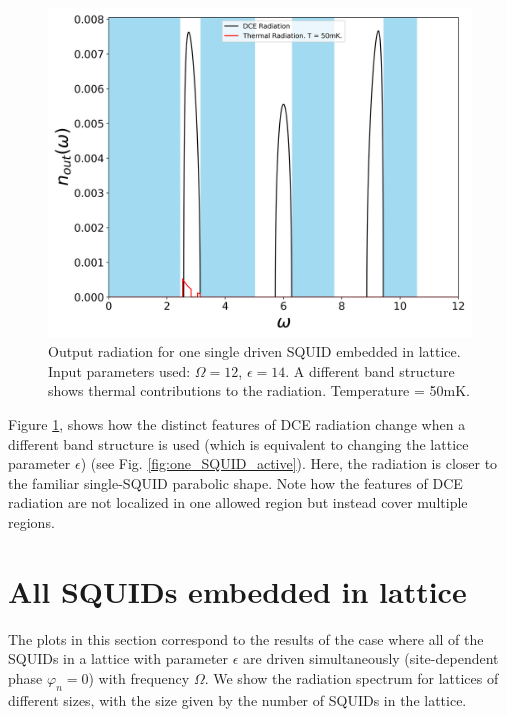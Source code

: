 \begin{figure}[h]
    \centering
    \includegraphics[width=\textwidth, keepaspectratio]{figures/results/one_SQUID_active_epsilon_14.png}
    \caption{Output radiation for one single driven SQUID embedded in lattice. Input parameters used: $\Omega=12$, $\epsilon=14$. A different band structure shows thermal contributions to the radiation. Temperature = 50mK.}
    \label{fig:one_SQUID_active_e_14_T_50}
\end{figure}
%

\newpage

Figure \ref{fig:one_SQUID_active_e_14_T_50}, shows how the distinct features of DCE radiation change when a different band structure is used (which is equivalent to changing the lattice parameter $\epsilon$) (see Fig. \ref{fig:one_SQUID_active}). Here, the radiation is closer to the familiar single-SQUID parabolic shape. Note how the features of DCE radiation are not localized in one allowed region but instead cover multiple regions. 

\section{All SQUIDs embedded in lattice}\label{sec:results_all_active}

The plots in this section correspond to the results of the case where all of the SQUIDs in a lattice with parameter $\epsilon$ are driven simultaneously (site-dependent phase $\varphi_n=0$) with frequency $\Omega$. We show the radiation spectrum for lattices of different sizes, with the size given by the number of SQUIDs in the lattice.

